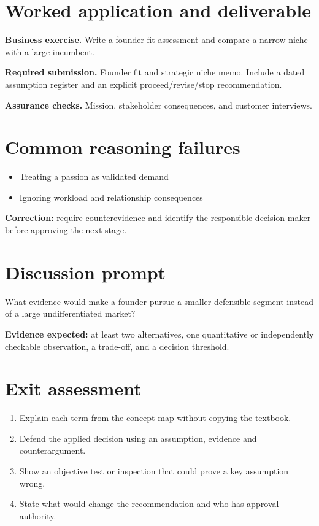 \documentclass[11pt,letterpaper]{article}
\begin{document}
\section{Worked application and deliverable}
\textbf{Business exercise.} Write a founder fit assessment and compare a narrow niche with a large incumbent.\par\textbf{Required submission.} Founder fit and strategic niche memo. Include a dated assumption register and an explicit proceed/revise/stop recommendation.\par\textbf{Assurance checks.} Mission, stakeholder consequences, and customer interviews.
\section{Common reasoning failures}
\begin{itemize}[leftmargin=*,itemsep=3pt]
\item Treating a passion as validated demand
\item Ignoring workload and relationship consequences
\end{itemize}
\noindent\textbf{Correction:} require counterevidence and identify the responsible decision-maker before approving the next stage.
\section{Discussion prompt}
What evidence would make a founder pursue a smaller defensible segment instead of a large undifferentiated market?\par\medskip\textbf{Evidence expected:} at least two alternatives, one quantitative or independently checkable observation, a trade-off, and a decision threshold.
\section{Exit assessment}
\begin{enumerate}[leftmargin=*,itemsep=5pt]
\item Explain each term from the concept map without copying the textbook.
\item Defend the applied decision using an assumption, evidence and counterargument.
\item Show an objective test or inspection that could prove a key assumption wrong.
\item State what would change the recommendation and who has approval authority.
\end{enumerate}

\end{document}
